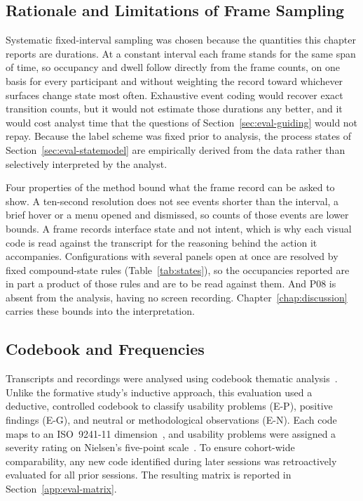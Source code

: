 \subsection{Rationale and Limitations of Frame Sampling}
\label{sec:eval-framemethod}
Systematic fixed-interval sampling was chosen because the quantities this chapter reports are durations. At a constant interval each frame stands for the same span of time, so occupancy and dwell follow directly from the frame counts, on one basis for every participant and without weighting the record toward whichever surfaces change state most often. Exhaustive event coding would recover exact transition counts, but it would not estimate those durations any better, and it would cost analyst time that the questions of Section~\ref{sec:eval-guiding} would not repay. Because the label scheme was fixed prior to analysis, the process states of Section~\ref{sec:eval-statemodel} are empirically derived from the data rather than selectively interpreted by the analyst.

Four properties of the method bound what the frame record can be asked to show. A ten-second resolution does not see events shorter than the interval, a brief hover or a menu opened and dismissed, so counts of those events are lower bounds. A frame records interface state and not intent, which is why each visual code is read against the transcript for the reasoning behind the action it accompanies. Configurations with several panels open at once are resolved by fixed compound-state rules (Table~\ref{tab:states}), so the occupancies reported are in part a product of those rules and are to be read against them. And P08 is absent from the analysis, having no screen recording. Chapter~\ref{chap:discussion} carries these bounds into the interpretation.

\subsection{Codebook and Frequencies}
\label{sec:eval-codebook}

Transcripts and recordings were analysed using codebook thematic analysis~\cite{braun_thematic_2022}. Unlike the formative study's inductive approach, this evaluation used a deductive, controlled codebook to classify usability problems (\mbox{E-P}), positive findings (\mbox{E-G}), and neutral or methodological observations (\mbox{E-N}). Each code maps to an ISO~9241-11 dimension~\cite{iso9241_11}, and usability problems were assigned a severity rating on Nielsen's five-point scale~\cite{nielsen1993}. To ensure cohort-wide comparability, any new code identified during later sessions was retroactively evaluated for all prior sessions. The resulting matrix is reported in Section~\ref{app:eval-matrix}.

